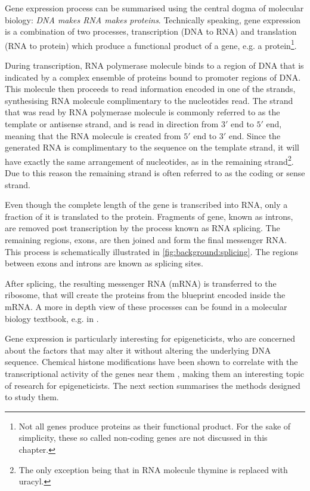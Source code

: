 \documentclass[parskip]{cs4rep}
\begin{document}
Gene expression process can be summarised using the central dogma of molecular biology: 
\emph{DNA makes RNA makes proteins}. Technically speaking, gene expression is a combination of two processes, transcription (DNA to RNA) and
translation (RNA to protein) which produce a functional product of a gene, e.g. a protein\footnote{Not all genes produce proteins as their functional product. For the sake of simplicity, these so called non-coding genes are not discussed in this chapter.}.

During transcription, RNA polymerase molecule binds to a region of DNA that is indicated by a complex ensemble of proteins bound to promoter regions of DNA. This molecule then proceeds to read information encoded in one of the strands, synthesising RNA molecule complimentary to the nucleotides read. The strand that was read by RNA polymerase molecule is commonly referred to as the template or antisense strand, and is read in direction from $3'$ end to $5'$ end, meaning that the RNA molecule is created from $5'$ end to $3'$ end. Since the generated RNA is complimentary to the sequence on the template strand, it will have exactly the same arrangement of nucleotides, as in the remaining strand\footnote{The only exception being that in RNA molecule thymine is replaced with uracyl.}. Due to this reason the remaining strand is often referred to as the coding or sense strand.

Even though the complete length of the gene is transcribed into RNA, only a fraction of it is translated to the protein. Fragments of gene, known as introns, are removed post transcription by the process known as RNA splicing. The remaining regions, exons, are then joined and form the final messenger RNA. This process is schematically illustrated in \autoref{fig:background:splicing}. The regions between exons and introns are known as splicing sites. 

After splicing, the resulting messenger RNA (mRNA) is transferred to the ribosome, that will create the proteins from the blueprint encoded inside the mRNA. A more in depth view of these processes can be found in a molecular biology textbook, e.g. in \cite{Alberts:2002te}.

Gene expression is particularly interesting for epigeneticists, who are concerned about the factors that may alter it without altering the underlying DNA sequence. Chemical histone modifications have been shown to correlate with the transcriptional activity of the genes near them \cite{Pokholok:2005wn,Kouzarides:2007js}, making them an interesting topic of research for epigeneticists. The next section summarises the methods designed to study them. 
 
\end{document}
